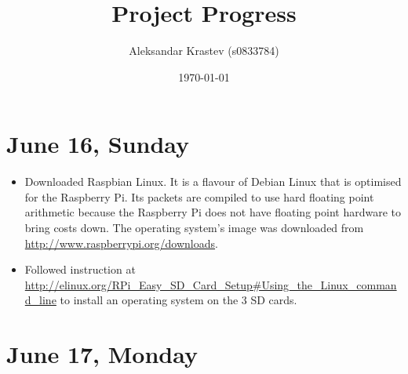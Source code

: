 \documentclass[a4paper,12pt]{article}
\begin{document}
\title{Project Progress}
\date{\today}
\author{Aleksandar Krastev (s0833784)}
\maketitle


\section{June 16, Sunday}

\begin{itemize}
	\item Downloaded Raspbian Linux. It is a flavour of Debian Linux that is optimised for the Raspberry Pi. Its packets are compiled to use hard floating point arithmetic because the Raspberry Pi does not have floating point hardware to bring costs down. The operating system's image was downloaded from \url{http://www.raspberrypi.org/downloads}.
	\item Followed instruction at \url{http://elinux.org/RPi_Easy_SD_Card_Setup#Using_the_Linux_command_line} to install an operating system on the 3 SD cards.
\end{itemize} 

\section{June 17, Monday}
\end{document}
